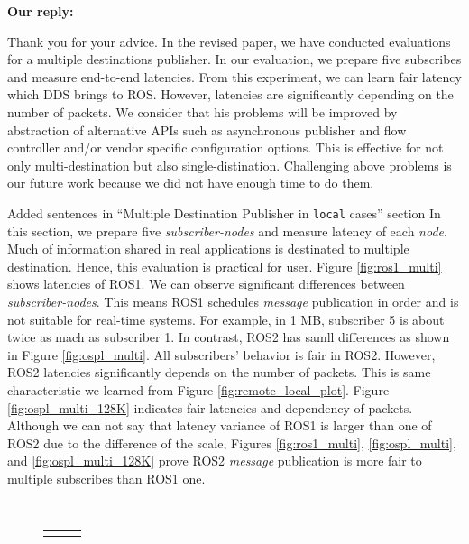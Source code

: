 \documentclass{article}
\begin{document}
\begin{enumerate}
  \begin{flushleft}
    \textbf{Our reply:}
  \end{flushleft}
  Thank you for your advice.
  In the revised paper, we have conducted evaluations for a multiple destinations publisher.
  In our evaluation, we prepare five subscribes and measure end-to-end latencies.
  From this experiment, we can learn fair latency which DDS brings to ROS.
  However, latencies are significantly depending on the number of packets.
  We consider that his problems will be improved by abstraction of alternative APIs such as asynchronous publisher and flow controller and/or vendor specific configuration options.
  This is effective for not only multi-destination but also single-distination.
  Challenging above problems is our future work because we did not have enough time to do them.
  \begin{itembox}[|]{Added sentences in ``Multiple Destination Publisher in \texttt{local} cases'' section}
    In this section, we prepare five \emph{subscriber-nodes} and measure latency of each \emph{node}.
    Much of information shared in real applications is destinated to multiple destination.
    Hence, this evaluation is practical for user.
    Figure \ref{fig:ros1_multi} shows latencies of ROS1.
    We can observe significant differences between \emph{subscriber-nodes}.
    This means ROS1 schedules \emph{message} publication in order and is not suitable for real-time systems.
    For example, in 1 MB, subscriber 5 is about twice as mach as subscriber 1.
    In contrast, ROS2 has samll differences as shown in Figure \ref{fig:ospl_multi}.
    All subscribers' behavior is fair in ROS2.
    However, ROS2 latencies significantly depends on the number of packets.
    This is same characteristic we learned from Figure \ref{fig:remote_local_plot}.
    Figure \ref{fig:ospl_multi_128K} indicates fair latencies and dependency of packets.
    Although we can not say that latency variance of ROS1 is larger than one of ROS2 due to the difference of the scale, Figures \ref{fig:ros1_multi}, \ref{fig:ospl_multi}, and \ref{fig:ospl_multi_128K} prove ROS2 \emph{message} publication is more fair to multiple subscribes than ROS1 one.
  \end{itembox}\\
  \setcounter{figure}{15}
  \begin{figure}[h]
    \begin{tabular}{ccc}
      \begin{minipage}[t]{0.31\textwidth}

\end{minipage}
\end{tabular}
\end{figure}
\end{enumerate}
\end{document}
